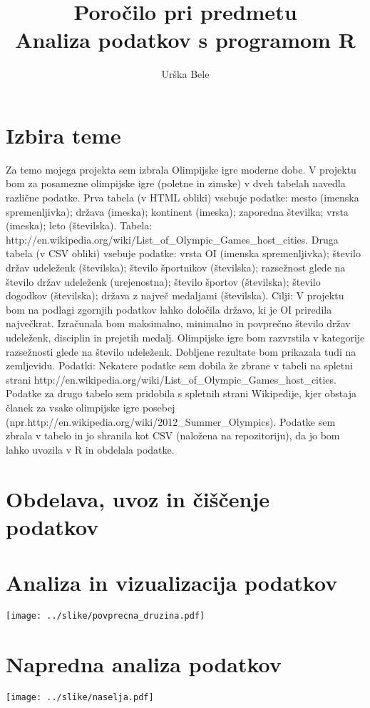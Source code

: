 \documentclass[11pt,a4paper]{article}
\begin{document}
\title{Poročilo pri predmetu \\
Analiza podatkov s programom R}
\author{Urška Bele}
\maketitle

\section{Izbira teme}
Za temo mojega projekta sem izbrala Olimpijske igre moderne dobe.
V projektu bom za posamezne olimpijske igre (poletne in zimske) v dveh tabelah navedla različne podatke.
Prva tabela (v HTML obliki) vsebuje podatke: mesto (imenska spremenljivka); država (imeska); kontinent (imeska); 
zaporedna številka; vrsta (imeska); leto (številska). Tabela: http://en.wikipedia.org/wiki/List_of_Olympic_Games_host_cities.
Druga tabela (v CSV obliki) vsebuje podatke: vrsta OI (imenska spremenljivka); število držav udeleženk (številska); 
število športnikov (številska); razsežnost glede na število držav udeleženk (urejenostna); število športov (številska); 
število dogodkov (številska); država z največ medaljami (številska).
Cilji: V projektu bom na podlagi zgornjih podatkov lahko določila državo, ki je OI priredila največkrat. 
Izračunala bom maksimalno, minimalno in povprečno število držav udeleženk, disciplin in prejetih medalj. 
Olimpijske igre bom razvrstila v kategorije razsežnosti glede na število udeleženk. Dobljene rezultate bom prikazala tudi 
na zemljevidu.
Podatki: Nekatere podatke sem dobila že zbrane v tabeli na spletni strani 
http://en.wikipedia.org/wiki/List_of_Olympic_Games_host_cities. Podatke za drugo tabelo sem pridobila s spletnih strani
 Wikipedije, kjer obstaja članek za vsake olimpijske igre posebej 
 (npr.http://en.wikipedia.org/wiki/2012_Summer_Olympics). 
 Podatke sem zbrala v tabelo in jo shranila kot CSV (naložena na repozitoriju), da jo bom lahko uvozila v R 
 in obdelala podatke.

\section{Obdelava, uvoz in čiščenje podatkov}

\section{Analiza in vizualizacija podatkov}

\texttt{[image: ../slike/povprecna\_druzina.pdf]}

\section{Napredna analiza podatkov}

\texttt{[image: ../slike/naselja.pdf]}
\end{document}
